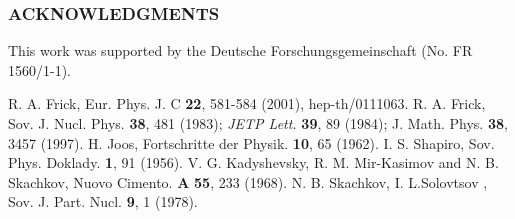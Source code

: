 \documentclass[a4paper,12pt]{article}
\begin{document}
\subsubsection*{ACKNOWLEDGMENTS}

This work was supported by the Deutsche Forschungsgemeinschaft (No. FR 1560/1-1).
\begin{thebibliography}{99}
R. A. Frick,  Eur. Phys. J. C {\bf 22}, 581-584 (2001), hep-th/0111063.
 R. A. Frick,  Sov. J. Nucl. Phys. {\bf 38}, 481 (1983); {\it JETP Lett.} {\bf 39}, 89 (1984);  J. Math. Phys. {\bf 38}, 3457 (1997).
H. Joos,  Fortschritte der Physik. {\bf 10}, 65 (1962).
I. S. Shapiro, Sov. Phys. Doklady. {\bf 1}, 91 (1956).
V. G. Kadyshevsky, R. M. Mir-Kasimov  and N. B. Skachkov,  Nuovo Cimento. {\bf A} {\bf 55}, 233 (1968).
N. B. Skachkov, I. L.Solovtsov ,  Sov. J. Part. Nucl. {\bf 9}, 1 (1978).
\end{thebibliography}
\end{document}
